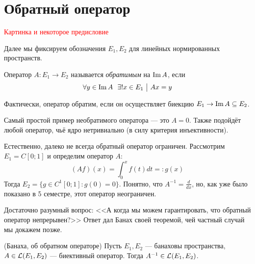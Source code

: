 \section{Обратный оператор}

\textcolor{red}{Картинка и некоторое предисловие}

\begin{note}
	Далее мы фиксируем обозначения $E_1, E_2$ для линейных нормированных пространств.
\end{note}

\begin{definition}
	Оператор $A \colon E_1 \to E_2$ называется \textit{обратимым} на $\operatorname{Im} A$, если
	\[
		\forall y \in \im A\ \ \exists ! x \in E_1 \such Ax = y
	\]
\end{definition}

\begin{anote}
	Фактически, оператор обратим, если он осуществляет биекцию $E_1 \to \operatorname{Im} A \subseteq E_2$.
\end{anote}

\begin{example}
	Самый простой пример необратимого оператора --- это $A = 0$. Также подойдёт любой оператор, чьё ядро нетривиально (в силу критерия инъективности).
\end{example}

\begin{example}
	Естественно, далеко не всегда обратный оператор ограничен. Рассмотрим $E_1 = C[0; 1]$ и определим оператор $A$:
	\[
		(Af)(x) = \int_0^x f(t)dt =: g(x)
	\]
	Тогда $E_2 = \{g \in C^1[0; 1] \colon g(0) = 0\}$. Понятно, что $A^{-1} = \frac{d}{dx}$, но, как уже было показано в 5 семестре, этот оператор неограничен.
\end{example}

\begin{note}
	Достаточно разумный вопрос: <<А когда мы можем гарантировать, что обратный оператор непрерывен?>> Ответ дал Банах своей теоремой, чей частный случай мы докажем позже.
\end{note}

\begin{theorem} (Банаха, об обратном операторе)
	Пусть $E_1, E_2$ --- банаховы пространства, $A \in \mathcal{L}(E_1, E_2)$ --- биективный оператор. Тогда $A^{-1} \in \mathcal{L}(E_1, E_2)$.
\end{theorem}